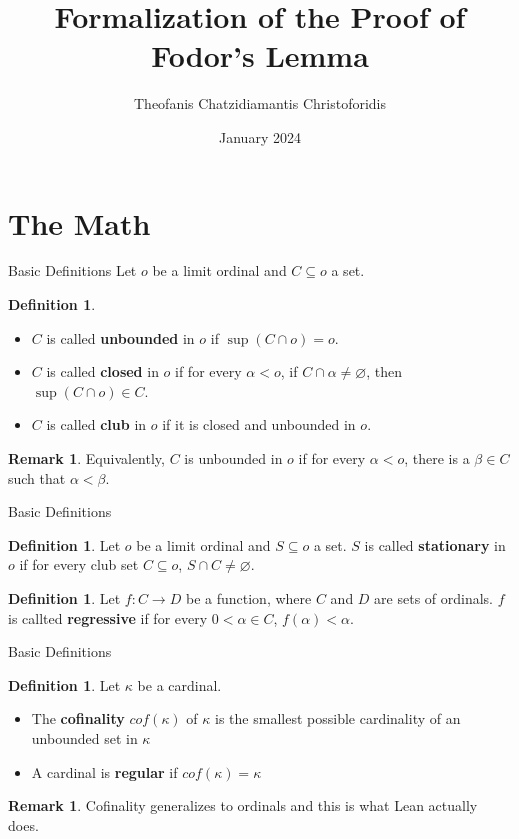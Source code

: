 \documentclass{beamer}
\title{Formalization of the Proof of Fodor's Lemma}
\author{Theofanis Chatzidiamantis Christoforidis}
\date{January 2024}
\theoremstyle{definition}
\newtheorem{defin}[subsection]{Definition}
\newtheorem{rem}[subsection]{Remark}
\begin{document}
\maketitle

\section{The Math}

\begin{frame}{Basic Definitions}
    Let $o$ be a limit ordinal and $C \subseteq o$ a set.
    \begin{defin}
        \begin{itemize} \itemsep0.2em
        \item $C$ is called \textbf{unbounded} in $o$ if $\sup (C\cap o)=o$.
        \pause
        \item $C$ is called \textbf{closed} in $o$ if for every $\alpha < o$, if $C\cap\alpha\neq\varnothing$, then $\sup (C\cap o)\in C$.
        \pause
        \item $C$ is called \textbf{club} in $o$ if it is closed and unbounded in $o$.
        \end{itemize}
    \end{defin}
    \pause
    \begin{rem}
        Equivalently, $C$ is unbounded in $o$ if for every $\alpha < o$, there is a $\beta\in C$ such that $\alpha<\beta$.
    \end{rem}
\end{frame}

\begin{frame}{Basic Definitions}
    \begin{defin}
    Let $o$ be a limit ordinal and $S\subseteq o$ a set. $S$ is called \textbf{stationary} in $o$ if for every club set $C\subseteq o$, $S\cap C\neq\varnothing$.
\end{defin}
\pause
\begin{defin}
    Let $f:C\to D$ be a function, where $C$ and $D$ are sets of ordinals. $f$ is callted \textbf{regressive} if for every $0 < \alpha \in C$, $f(\alpha) < \alpha$.
\end{defin}
\end{frame}

\begin{frame}{Basic Definitions}
    \begin{defin}
        Let $\kappa$ be a cardinal.
        \begin{itemize}
            \item The \textbf{cofinality} $cof(\kappa)$ of $\kappa$ is the smallest possible cardinality of an unbounded set in $\kappa$ \pause
            \item A cardinal is \textbf{regular} if $cof(\kappa)=\kappa$
        \end{itemize} \pause
        \begin{rem}
            Cofinality generalizes to ordinals and this is what Lean actually does.
        \end{rem}
    \end{defin}

\end{frame}
\end{document}
